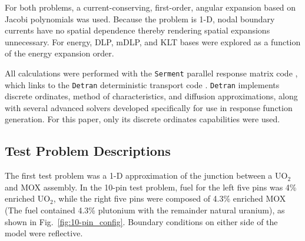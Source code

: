 \documentclass[5p,times,twocolumn,10pt]{elsarticle}
\begin{document}
    For both problems, a current-conserving, first-order, angular expansion 
    based on Jacobi polynomials \cite{Roberts2014} was used.  Because the 
    problem is 1-D, nodal boundary currents have no spatial dependence thereby 
    rendering spatial expansions unnecessary. For energy, DLP, mDLP, and KLT 
    bases were explored as a function of the energy expansion order.
    
    All calculations were performed with the {\tt Serment} parallel response 
    matrix code \cite{RobertsSerment}, which links to the {\tt Detran} 
    deterministic transport code \cite{RobertsDetran}. {\tt Detran} implements 
    discrete ordinates, method of characteristics, and diffusion 
    approximations, along with several advanced solvers developed specifically 
    for use in response function generation. For this paper, only its discrete 
    ordinates capabilities were used.
    
    \subsection{Test Problem Descriptions}
    The first test problem was a 1-D approximation of the junction between a 
    UO$_2$ and MOX assembly.  
    In the 10-pin test problem, fuel for the left five pins was 
    4\% enriched UO$_2$, while the right five pins were composed of 
    4.3\% enriched MOX (The fuel contained 4.3\% plutonium with the remainder 
    natural uranium), as shown in Fig.~\ref{fig:10-pin_config}. Boundary 
    conditions on either 
    side of the model were reflective. 
    
    \begin{figure*}[htb]
        \centering
        \caption{Configuration for 10-pin Test Problem}
        \label{fig:10-pin_config}
    \end{figure*}
\end{document}
